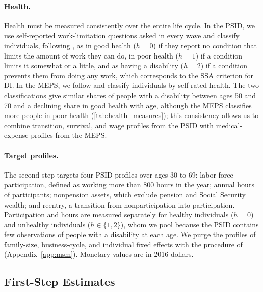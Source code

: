 \paragraph{Health.} Health must be measured consistently over the entire life cycle. In the PSID, we use self-reported work-limitation questions asked in every wave and classify individuals, following \citet{Low2015}, as in good health ($h=0$) if they report no condition that limits the amount of work they can do, in poor health ($h=1$) if a condition limits it somewhat or a little, and as having a disability ($h=2$) if a condition prevents them from doing any work, which corresponds to the SSA criterion for DI. In the MEPS, we follow \citet{Pashchenko2019} and classify individuals by self-rated health. The two classifications give similar shares of people with a disability between ages 50 and 70 and a declining share in good health with age, although the MEPS classifies more people in poor health (\autoref{tab:health_measures}); this consistency allows us to combine transition, survival, and wage profiles from the PSID with medical-expense profiles from the MEPS.

\paragraph{Target profiles.} The second step targets four PSID profiles over ages 30 to 69: labor force participation, defined as working more than 800 hours in the year; %
annual hours of participants; nonpension assets, which exclude pension and Social Security wealth; and reentry, a transition from nonparticipation into participation. Participation and hours are measured separately for healthy individuals ($h=0$) and unhealthy individuals ($h\in\{1,2\}$), whom we pool because the PSID contains few observations of people with a disability at each age. We purge the profiles of family-size, business-cycle, and individual fixed effects with the procedure of \citet{french2005effects} (Appendix~\ref{app:msm}). Monetary values are in 2016 dollars.

\subsection{First-Step Estimates}

